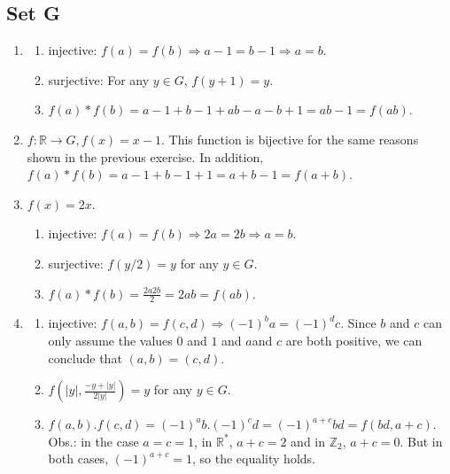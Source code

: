 \documentclass{article}
\begin{document}
\subsection{Set G}
\begin{enumerate}
    \item 
        \begin{enumerate}
            \item injective: $ f(a) = f(b) \Rightarrow a - 1 = b - 1 \Rightarrow a = b $.

            \item surjective: For any $ y \in G $, $ f(y + 1) = y $.

            \item $ f(a) * f(b) = a - 1 + b - 1 + ab - a - b + 1 = ab -1 = f(ab) $.
        \end{enumerate}

    \item $ f: \mathbb{R} \to G, f(x) = x - 1 $. This function is bijective for the same reasons shown in the previous exercise. In addition, $ f(a) * f(b) = a - 1 + b - 1 + 1 = a + b - 1 = f(a + b) $.

    \item $ f(x) = 2x $.
        \begin{enumerate}
            \item injective: $ f(a) = f(b) \Rightarrow 2a = 2b \Rightarrow a = b $.

            \item surjective: $ f(y/2) = y$ for any $ y \in G $.

            \item $ f(a) * f(b) = \frac{2a2b}{2} = 2ab = f(ab) $.
        \end{enumerate}

    \item
        \begin{enumerate}
            \item injective: $ f(a, b) = f(c, d) \Rightarrow (-1)^ba = (-1)^dc $. Since $ b $ and $ c $ can only assume the values $ 0 $ and $ 1 $ and $ a $and $ c $ are both positive, we can conclude that $ (a, b) = (c, d) $.

            \item $ f\left(|y|, \frac{-y + |y|}{2|y|} \right) = y $ for any $y \in G$.

            \item $ f(a, b).f(c, d) = (-1)^ab.(-1)^cd = (-1)^{a + c}bd = f(bd, a + c) $. Obs.: in the case $  a = c = 1 $, in $ \mathbb{R}^* $, $ a + c = 2 $ and in $ \mathbb{Z}_2 $, $ a + c = 0 $. But in both cases, $ (-1)^{a + c} = 1 $, so the equality holds.
        \end{enumerate}
\end{enumerate}
\end{document}

